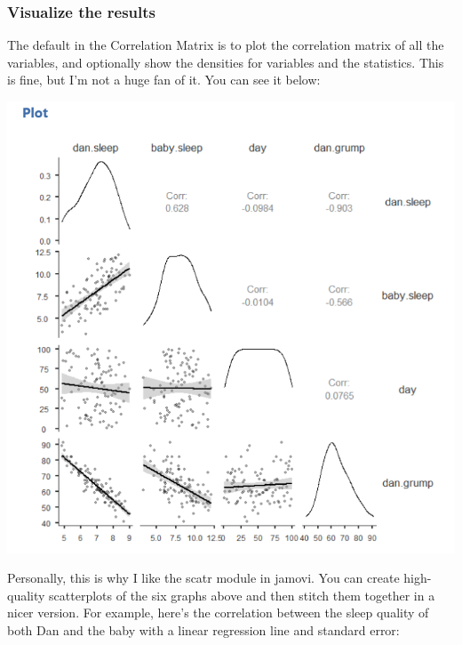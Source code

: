 \documentclass[
]{book}
\begin{document}
\hypertarget{visualize-the-results-7}{%
\subsubsection{Visualize the results}\label{visualize-the-results-7}}

The default in the Correlation Matrix is to plot the correlation matrix of all the variables, and optionally show the densities for variables and the statistics. This is fine, but I'm not a huge fan of it. You can see it below:

\includegraphics{images/08-correlation/correlation-plots.png}

Personally, this is why I like the scatr module in jamovi. You can create high-quality scatterplots of the six graphs above and then stitch them together in a nicer version. For example, here's the correlation between the sleep quality of both Dan and the baby with a linear regression line and standard error:
\end{document}

